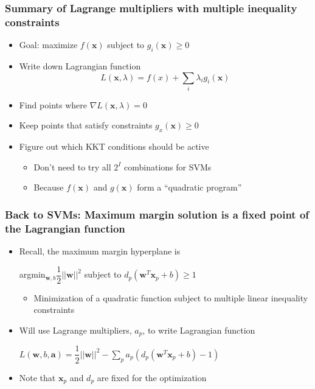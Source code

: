 \documentclass[12pt,notes,mathserif]{beamer}
\begin{document}
\begin{frame}[c]
\frametitle{Summary of Lagrange multipliers with multiple inequality constraints}
\begin{itemize}
\item Goal: maximize $f(\bm{x})$ subject to $g_i(\bm{x})\geqslant{} 0$
\item Write down Lagrangian function
\[
L(\bm{x},\lambda)=f(x)+\sum_i\lambda_ig_i(\bm{x})
\]
\item Find points where $\nabla L(\bm{x},\lambda)= 0$
\item Keep points that satisfy constraints $g_x(\bm{x})\geqslant{}0$
\item Figure out which KKT conditions should be active
\begin{itemize}
\item Don't need to try all $2^I$ combinations for SVMs
\item Because $f(\bm{x})$ and $g(\bm{x})$ form a ``quadratic program''
\end{itemize}
\end{itemize}
\end{frame}

\begin{frame}[c]
\frametitle{Back to SVMs: Maximum margin solution is a fixed point of the Lagrangian function}
\begin{itemize}
\item Recall, the maximum margin hyperplane is

argmin$_{\bm{w},b} \dfrac{1}{2}||\bm{w}||^2$ subject to $d_p(\bm{w}^T \bm{x}_p+b)\geqslant{}1$
\begin{itemize}
\item Minimization of a quadratic function subject to multiple linear inequality constraints
\end{itemize}
\item Will use Lagrange multipliers, $a_p$, to write Lagrangian function

$L(\bm{w},b,\bm{a})=\dfrac{1}{2}||\bm{w}||^2-\sum\limits_pa_p(d_p(\bm{w}^T\bm{x}_p+b)-1)$
\item Note that $\bm{x}_p$ and $d_p$ are fixed for the optimization
\end{itemize}
\end{frame}
\end{document}
